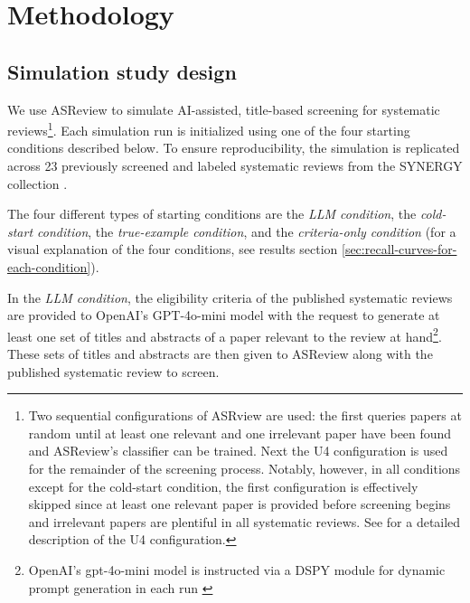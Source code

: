 \documentclass[12pt]{article}
\begin{document}

\section{Methodology}

\subsection{Simulation study design}

We use ASReview to simulate AI-assisted, title-based screening for systematic reviews\footnote{Two sequential configurations of ASRview are used: the first queries papers at random until at least one relevant and one irrelevant paper have been found and ASReview's classifier can be trained. Next the U4 configuration is used for the remainder of the screening process. Notably, however, in all conditions except for the cold-start condition, the first configuration is effectively skipped since at least one relevant paper is provided before screening begins and irrelevant papers are plentiful in all systematic reviews. See \textcite{asreviewvs2jonathan} for a detailed description of the U4 configuration.}. Each simulation run is initialized using one of the four starting conditions described below. To ensure reproducibility, the simulation is replicated across 23 previously screened and labeled systematic reviews from the SYNERGY collection \parencite{de2023synergy}.

The four different types of starting conditions are the \textit{LLM condition}, the \textit{cold-start condition}, the \textit{true-example condition}, and the \textit{criteria-only condition} (for a visual explanation of the four conditions, see results section \ref{sec:recall-curves-for-each-condition}).

In the \textit{LLM condition}, the eligibility criteria of the published systematic reviews are provided to OpenAI's GPT-4o-mini model with the request to generate at least one set of titles and abstracts of a paper relevant to the review at hand\footnote{OpenAI's gpt-4o-mini model is instructed via a DSPY module for dynamic prompt generation in each run \parencite{khattab2023dspy}}. These sets of titles and abstracts are then given to ASReview along with the published systematic review to screen. 
\end{document}
